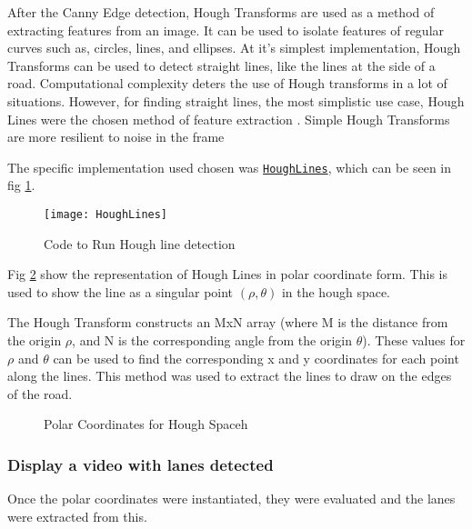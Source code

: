 \documentclass[conference]{IEEEtran}
\begin{document}
After the Canny Edge detection, Hough Transforms are used as a method of extracting features from an image. It can be used to isolate features of regular curves such as, circles, lines, and ellipses. At it's simplest implementation, Hough Transforms can be used to detect straight lines, like the lines at the side of a road. Computational complexity deters the use of Hough transforms in a lot of situations. However, for finding straight lines, the most simplistic use case, Hough Lines were the chosen method of feature extraction \cite{Hough_Transform}. Simple Hough Transforms are more resilient to noise in the frame \cite{Hough_Lines_Better_Against_Noise}

The specific implementation used chosen was \href{https://docs.opencv.org/3.4/d9/db0/tutorial_hough_lines.html}{\texttt{HoughLines}}, which can be seen in fig \ref{fig:HoughLines}.

\begin{figure}[H]
\centerline{\texttt{[image: HoughLines]}}
\caption{Code to Run Hough line detection}
\label{fig:HoughLines}
\end{figure}

Fig \ref{fig:Polar_Coordinates_for_Hough_transforms} show the representation of Hough Lines in polar coordinate form. This is used to show the line as a singular point $(\rho, \theta)$ in the hough space. 

The Hough Transform constructs an MxN array (where M is the distance from the origin $\rho$, and N is the corresponding angle from the origin $\theta$). These values for $\rho$ and $\theta$ can be used to find the corresponding x and y coordinates for each point along the lines. This method was used to extract the lines to draw on the edges of the road. 

\begin{figure}[H]
\centering
{}
\caption{Polar Coordinates for Hough Spaceh}
\label{fig:Polar_Coordinates_for_Hough_transforms}
\end{figure} 

\subsubsection{Display a video with lanes detected}

Once the polar coordinates were instantiated, they were evaluated and the lanes were extracted from this. 
\end{document}
